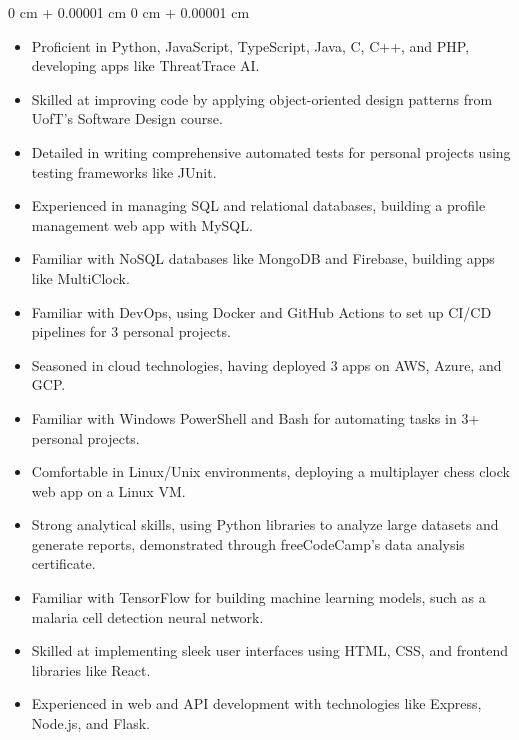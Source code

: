 \documentclass[10pt, letterpaper]{article}
\newenvironment{highlightsforbulletentries}{
    \begin{itemize}[
        topsep=0.10 cm,
        parsep=0.10 cm,
        partopsep=0pt,
        itemsep=0pt,
        leftmargin=10pt
    ]
}{
    \end{itemize}
} %
\newenvironment{onecolentry}{
    \begin{adjustwidth}{
        0 cm + 0.00001 cm
    }{
        0 cm + 0.00001 cm
    }
}{
    \end{adjustwidth}
} %
\begin{document}
    \begin{onecolentry}
        \begin{highlightsforbulletentries}


        \item Proficient in Python, JavaScript, TypeScript, Java, C, C++, and PHP, developing apps like ThreatTrace AI.

        \item Skilled at improving code by applying object-oriented design patterns from UofT’s Software Design course.

        \item Detailed in writing comprehensive automated tests for personal projects using testing frameworks like JUnit.

        \item Experienced in managing SQL and relational databases, building a profile management web app with MySQL.

        \item Familiar with NoSQL databases like MongoDB and Firebase, building apps like MultiClock.

        \item Familiar with DevOps, using Docker and GitHub Actions to set up CI/CD pipelines for 3 personal projects.

        \item Seasoned in cloud technologies, having deployed 3 apps on AWS, Azure, and GCP.

        \item Familiar with Windows PowerShell and Bash for automating tasks in 3+ personal projects.

        \item Comfortable in Linux/Unix environments, deploying a multiplayer chess clock web app on a Linux VM.

        \item Strong analytical skills, using Python libraries to analyze large datasets and generate reports, demonstrated through freeCodeCamp's data analysis certificate.

        \item Familiar with TensorFlow for building machine learning models, such as a malaria cell detection neural network.

        \item Skilled at implementing sleek user interfaces using HTML, CSS, and frontend libraries like React.

        \item Experienced in web and API development with technologies like Express, Node.js, and Flask.


\end{highlightsforbulletentries}
\end{onecolentry}
\end{document}
